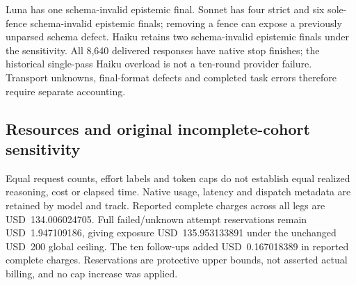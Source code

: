 \documentclass[a4paper,preprint,12pt,numbers,nopreprintline]{elsarticle}
\begin{document}
Luna has one schema-invalid epistemic final. Sonnet has four strict and six sole-fence schema-invalid epistemic finals; removing a fence can expose a previously unparsed schema defect. Haiku retains two schema-invalid epistemic finals under the sensitivity. All 8,640 delivered responses have native stop finishes; the historical single-pass Haiku overload is not a ten-round provider failure. Transport unknowns, final-format defects and completed task errors therefore require separate accounting.

\subsection{Resources and original incomplete-cohort sensitivity}
Equal request counts, effort labels and token caps do not establish equal realized reasoning, cost or elapsed time. Native usage, latency and dispatch metadata are retained by model and track. Reported complete charges across all legs are USD~134.006024705. Full failed/unknown attempt reservations remain USD~1.947109186, giving exposure USD~135.953133891 under the unchanged USD~200 global ceiling. The ten follow-ups added USD~0.167018389 in reported complete charges. Reservations are protective upper bounds, not asserted actual billing, and no cap increase was applied.
\end{document}
